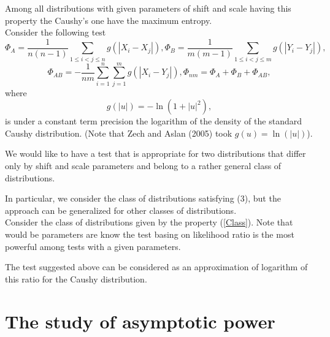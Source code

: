 \documentclass[final,11pt,3p]{elsarticle}
\begin{document}
Among all distributions with given parameters of shift and scale having this property the Caushy's one have the maximum entropy.\\


Consider the following test
\begin{equation}
 \Phi_{A}=\frac{1}{n(n-1)}\sum_{1\leq i<j\leq n} g(|X_i-X_j|),
\Phi_{B}=\frac{1}{m(m-1)}\sum_{1\leq i<j\leq m} g(|Y_i-Y_j|),
\end{equation}
\begin{equation}\label{K1}
\Phi_{AB}=-\frac{1}{nm}\sum_{i=1}^n\sum_{j=1}^m g(|X_i-Y_j|),
\Phi_{nm}=\Phi_{A}+ \Phi_{B}+ \Phi_{AB},
\end{equation}
where
$$
g(|u|)= -\ln (1+|u|^2),
$$
is under a constant term precision the logarithm of the density of the standard Caushy distribution.
(Note that Zech and Aslan (2005) took $g(u)=\ln(|u|)$).



We would like to have a test that is appropriate for two distributions that differ only by shift and scale parameters and belong to a rather general class of distributions.


In particular, we consider the class of distributions satisfying (3), but the approach can be generalized for other classes of distributions.\\
\bigskip
Consider the class of distributions given by the property (\ref{Class}).  Note that would be parameters are know the test basing on likelihood ratio is the most powerful among tests with a given parameters.


The test suggested above can be considered as an approximation of logarithm of this ratio for the Caushy distribution.





\section{The study of asymptotic power}
\label{S:2}
\end{document}
